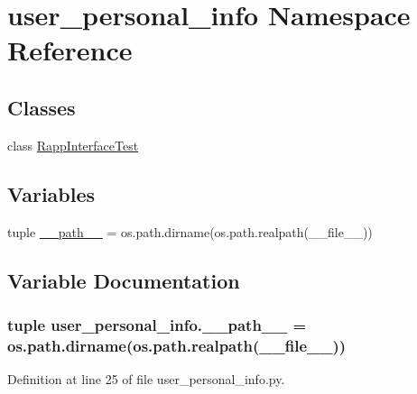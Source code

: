 \hypertarget{namespaceuser__personal__info}{\section{user\-\_\-personal\-\_\-info Namespace Reference}
\label{namespaceuser__personal__info}
}
\subsection*{Classes}
\begin{DoxyCompactItemize}
\item 
class \hyperlink{classuser__personal__info_1_1RappInterfaceTest}{Rapp\-Interface\-Test}
\end{DoxyCompactItemize}
\subsection*{Variables}
\begin{DoxyCompactItemize}
\item 
tuple \hyperlink{namespaceuser__personal__info_a6630ea6bca92be1795f0eadedd942489}{\-\_\-\-\_\-path\-\_\-\-\_\-} = os.\-path.\-dirname(os.\-path.\-realpath(\-\_\-\-\_\-file\-\_\-\-\_\-))
\end{DoxyCompactItemize}


\subsection{Variable Documentation}
\hypertarget{namespaceuser__personal__info_a6630ea6bca92be1795f0eadedd942489}{
\subsubsection[{\-\_\-\-\_\-path\-\_\-\-\_\-}]{\setlength{\rightskip}{0pt plus 5cm}tuple user\-\_\-personal\-\_\-info.\-\_\-\-\_\-path\-\_\-\-\_\- = os.\-path.\-dirname(os.\-path.\-realpath(\-\_\-\-\_\-file\-\_\-\-\_\-))}}\label{namespaceuser__personal__info_a6630ea6bca92be1795f0eadedd942489}


Definition at line 25 of file user\-\_\-personal\-\_\-info.\-py.

